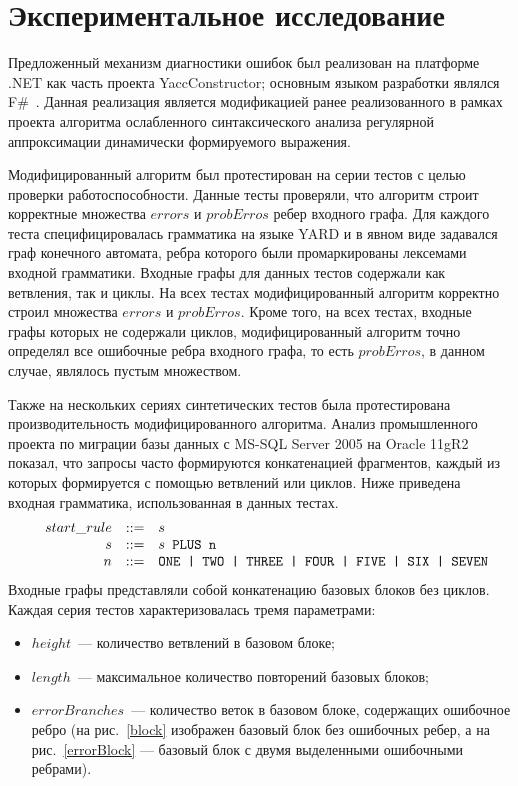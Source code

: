 \section{Экспериментальное исследование}
Предложенный механизм диагностики ошибок был реализован на платформе .NET как часть проекта YaccConstructor; основным языком разработки являлся F\#~\cite{FSharp}. Данная реализация является модификацией ранее реализованного в рамках проекта алгоритма ослабленного синтаксического анализа регулярной аппроксимации динамически формируемого выражения.

Модифицированный алгоритм был протестирован на серии тестов с целью проверки работоспособности. Данные тесты проверяли, что алгоритм строит корректные множества $errors$ и $probErros$ ребер входного графа. Для каждого теста специфицировалась грамматика на языке YARD и в явном виде задавался граф конечного автомата, ребра которого были промаркированы лексемами входной грамматики. Входные графы для данных тестов содержали как ветвления, так и циклы. На всех тестах модифицированный алгоритм корректно строил множества $errors$ и $probErros$. Кроме того, на всех тестах, входные графы которых не содержали циклов, модифицированный алгоритм точно определял все ошибочные ребра входного графа, то есть $probErros$, в данном случае, являлось пустым множеством.

Также на нескольких сериях синтетических тестов была протестирована производительность модифицированного алгоритма. Анализ промышленного проекта по миграции базы данных с MS-SQL Server 2005 на Oracle 11gR2 показал, что запросы часто формируются конкатенацией фрагментов, каждый из которых формируется с помощью ветвлений или циклов. Ниже приведена входная грамматика, использованная в данных тестах.
$$
\begin{array}{crcl}
& start\_rule &::=& s \\
& s & ::= & s \mbox{\texttt{ PLUS }} \mbox{\texttt{n}}\\
& n & ::= & \mbox{\texttt{ONE | }} \mbox{\texttt{TWO | }} \mbox{\texttt{THREE | }} \mbox{\texttt{FOUR | }} \mbox{\texttt{FIVE | }} \mbox{\texttt{SIX | }} \mbox{\texttt{SEVEN}}
\end{array}
$$
Входные графы представляли собой конкатенацию базовых блоков без циклов. Каждая серия тестов характеризовалась тремя параметрами: 
\begin{itemize}
  \item $height$~--- количество ветвлений в базовом блоке;
  \item $length$~--- максимальное количество повторений базовых блоков;
  \item $errorBranches$~--- количество веток в базовом блоке, содержащих ошибочное ребро (на рис.~\ref{block} изображен базовый блок без ошибочных ребер, а на рис.~\ref{errorBlock} --- базовый блок с двумя выделенными ошибочными ребрами).
\end{itemize}

